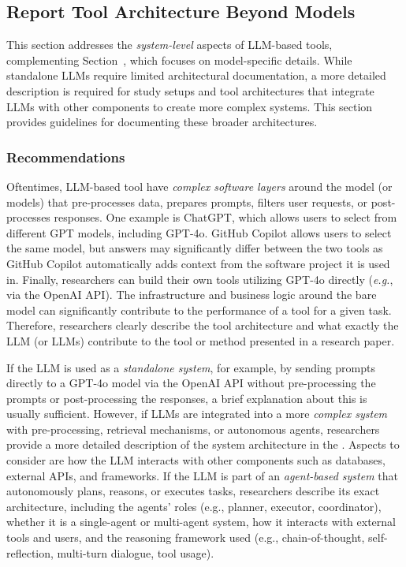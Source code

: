 



\subsection{Report Tool Architecture Beyond Models}

This section addresses the \emph{system-level} aspects of LLM-based tools, complementing Section~\modelversion, which focuses on model-specific details.
While standalone LLMs require limited architectural documentation, a more detailed description is required for study setups and tool architectures that integrate LLMs with other components to create more complex systems.
This section provides guidelines for documenting these broader architectures.

\subsubsection{Recommendations}

Oftentimes, LLM-based tool have \emph{complex software layers} around the model (or models) that pre-processes data, prepares prompts, filters user requests, or post-processes responses.
One example is ChatGPT, which allows users to select from different GPT models, including GPT-4o.
GitHub Copilot allows users to select the same model, but answers may significantly differ between the two tools as GitHub Copilot automatically adds context from the software project it is used in.
Finally, researchers can build their own tools utilizing GPT-4o directly (\textit{e.g.}, via the OpenAI API).
The infrastructure and business logic around the bare model can significantly contribute to the performance of a tool for a given task.
Therefore, researchers \must clearly describe the tool architecture and what exactly the LLM (or LLMs) contribute to the tool or method presented in a research paper.

If the LLM is used as a \emph{standalone system}, for example, by sending prompts directly to a GPT-4o model via the OpenAI API without pre-processing the prompts or post-processing the responses, a brief explanation about this is usually sufficient.
However, if LLMs are integrated into a more \emph{complex system} with pre-processing, retrieval mechanisms, or autonomous agents, researchers \must provide a more detailed description of the system architecture in the \paper.
Aspects to consider are how the LLM interacts with other components such as databases, external APIs, and frameworks.
If the LLM is part of an \emph{agent-based system} that autonomously plans, reasons, or executes tasks, researchers \must describe its exact architecture, including the agents' roles (e.g., planner, executor, coordinator), whether it is a single-agent or multi-agent system, how it interacts with external tools and users, and the reasoning framework used (e.g., chain-of-thought, self-reflection, multi-turn dialogue, tool usage).

